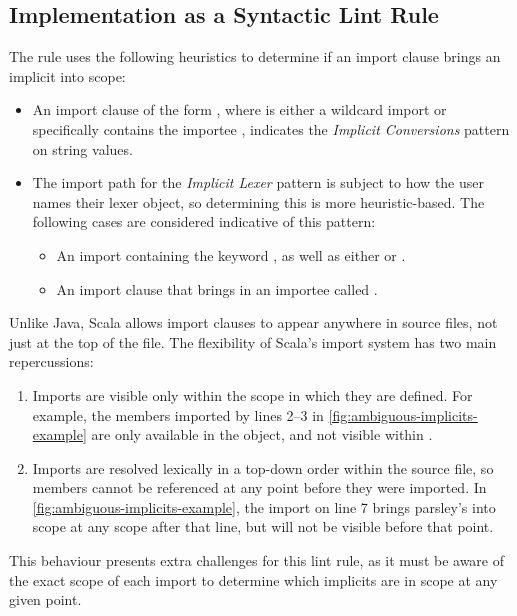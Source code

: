 \documentclass[../../main.tex]{subfiles}
\begin{document}
\subsection{Implementation as a Syntactic Lint Rule}
The rule uses the following heuristics to determine if an import clause brings an implicit into scope:
\begin{itemize}
  \item An import clause of the form , where  is either a wildcard import or specifically contains the importee , indicates the \emph{Implicit Conversions} pattern on string values.
  \item The import path for the \emph{Implicit Lexer} pattern is subject to how the user names their lexer object, so determining this is more heuristic-based. The following cases are considered indicative of this pattern:
  \begin{itemize}
    \item An import containing the keyword , as well as either  or .
    \item An import clause that brings in an importee called .
  \end{itemize}
\end{itemize}
%
Unlike Java, Scala allows import clauses to appear anywhere in source files, not just at the top of the file.
The flexibility of Scala's import system has two main repercussions:
\begin{enumerate}
  \item Imports are visible only within the scope in which they are defined. For example, the members imported by lines 2--3 in \cref{fig:ambiguous-implicits-example} are only available in the  object, and not visible within .
  \item Imports are resolved lexically in a top-down order within the source file, so members cannot be referenced at any point before they were imported. In \cref{fig:ambiguous-implicits-example}, the import on line 7 brings parsley's  into scope at any scope after that line, but will not be visible before that point.
\end{enumerate} 
This behaviour presents extra challenges for this lint rule, as it must be aware of the exact scope of each import to determine which implicits are in scope at any given point.
\end{document}
